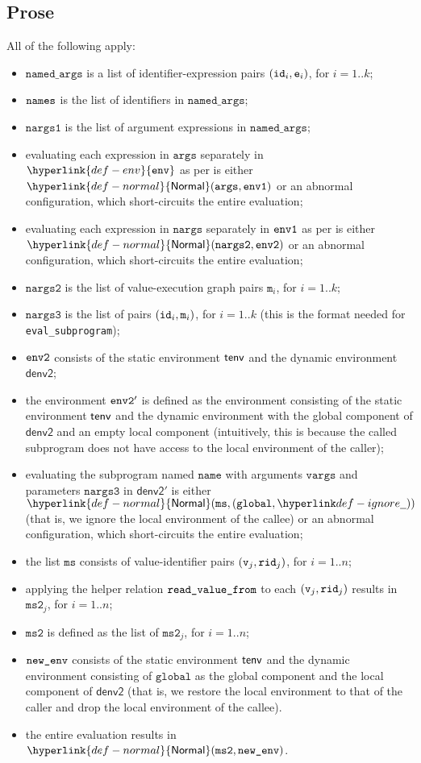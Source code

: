 \documentclass{book}
\newcommand\ProseOrAbnormal[0]{or an abnormal configuration, which short-circuits the entire evaluation}
\newcommand\Normal[0]{\hyperlink{def-normal}{\textsf{Normal}}}
\newcommand\env[0]{\hyperlink{def-env}{\texttt{env}}}
\newcommand\denvtwo[0]{\textsf{denv2}}
\newcommand\vm[0]{\texttt{m}}
\newcommand\vms[0]{\texttt{ms}}
\newcommand\vmstwo[0]{\texttt{ms2}}
\newcommand\name[0]{\texttt{name}}
\newcommand\args[0]{\texttt{args}}
\newcommand\namedargs[0]{\texttt{named\_args}}
\newcommand\nargs[0]{\texttt{nargs}}
\newcommand\nargsone[0]{\texttt{nargs1}}
\newcommand\nargstwo[0]{\texttt{nargs2}}
\newcommand\nargsthree[0]{\texttt{nargs3}}
\newcommand\vvargs[0]{\texttt{vargs}}
\newcommand\vglobal[0]{\texttt{global}}
\newcommand\rid[0]{\texttt{rid}}
\begin{document}
\subsection{Prose}
All of the following apply:
\begin{itemize}
  \item $\namedargs$ is a list of identifier-expression pairs $(\texttt{id}_i, \texttt{e}_i)$, for $i=1..k$;
  \item $\texttt{names}$ is the list of identifiers in $\namedargs$;
  \item $\nargsone$ is the list of argument expressions in $\namedargs$;
  \item evaluating each expression in $\args$ separately in $\env$ as per 
  is either $\Normal(\vargs, \envone)$ \ProseOrAbnormal;
  \item evaluating each expression in $\nargs$ separately in $\texttt{env1}$ as per 
  is either $\Normal(\nargstwo, \envtwo)$ \ProseOrAbnormal;
  \item $\nargstwo$ is the list of value-execution graph pairs $\vm_i$, for $i=1..k$;
  \item $\nargsthree$ is the list of pairs $(\id_i, \vm_i)$, for $i=1..k$ (this is the format needed
  for \texttt{eval\_subprogram});
  \item $\texttt{env2}$ consists of the static environment $\textsf{tenv}$ and the dynamic environment $\denvtwo$;
  \item the environment $\texttt{env2}'$ is defined as the environment
  consisting of the static environment $\textsf{tenv}$ and the dynamic environment with the global component
  of $\denvtwo$ and an empty local component (intuitively, this is because the called subprogram does not have access
  to the local environment of the caller);
  \item evaluating the subprogram named $\name$ with arguments $\vvargs$ and parameters $\nargsthree$ in
  $\denvtwo'$ is either $\Normal(\vms, (\vglobal, \Ignore))$ (that is, we ignore the local environment
  of the callee) \ProseOrAbnormal;
  \item the list $\vms$ consists of value-identifier pairs $(\vv_j, \rid_j)$, for $i=1..n$;
  \item applying the helper relation $\texttt{read\_value\_from}$ to each $(\vv_j, \rid_j)$
  results in $\vmstwo_j$, for $i=1..n$;
  \item $\vmstwo$ is defined as the list of $\vmstwo_j$, for $i=1..n$;
  \item $\texttt{new\_env}$ consists of the static environment $\textsf{tenv}$ and the dynamic environment consisting
  of $\vglobal$ as the global component and the local component of $\denvtwo$ (that is, we restore
  the local environment to that of the caller and drop the local environment of the callee).
  \item the entire evaluation results in $\Normal(\vmstwo, \newenv)$.
\end{itemize}
\end{document}
